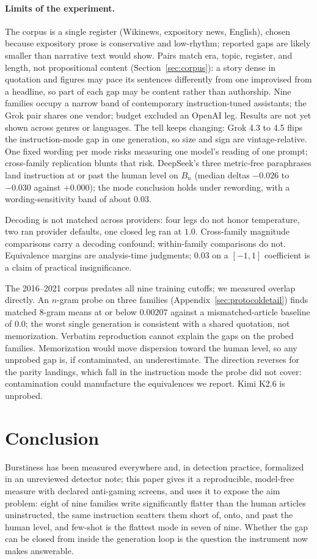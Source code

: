 \documentclass{article}
\begin{document}
\paragraph{Limits of the experiment.}
The corpus is a single register (Wikinews, expository news, English), chosen because expository
prose is conservative and low-rhythm; reported gaps are likely smaller than narrative text
would show. Pairs match era, topic, register, and length, not propositional content
(Section~\ref{sec:corpus}): a story dense in quotation and figures may pace its sentences
differently from one improvised from a headline, so part of each gap may be content
rather than authorship.
Nine families occupy a narrow band of contemporary instruction-tuned assistants; the Grok
pair shares one vendor; budget excluded an OpenAI leg. Results are not yet
shown across genres or languages. The tell keeps changing: Grok 4.3
to 4.5 flips the instruction-mode gap in one generation, so size and sign are
vintage-relative. One fixed wording per mode risks
measuring one model's reading of one prompt; cross-family replication blunts that risk.
DeepSeek's three metric-free paraphrases land instruction at or past the human level on $B_n$
(median deltas $-0.026$ to $-0.030$ against $+0.000$); the mode conclusion holds
under rewording, with a wording-sensitivity band of about $0.03$.

Decoding is not matched across providers: four legs do not honor temperature, two ran
provider defaults, one closed leg ran at $1.0$. Cross-family magnitude comparisons
carry a decoding confound; within-family comparisons do not. Equivalence margins are
analysis-time judgments; $0.03$ on a $[-1,1]$ coefficient is a claim of practical
insignificance.

The 2016--2021 corpus predates all nine training cutoffs; we measured overlap directly. An
$n$-gram probe on three families (Appendix~\ref{sec:protocoldetail}) finds matched 8-gram means
at or below $0.00207$ against a mismatched-article baseline of $0.0$; the worst single
generation is consistent with a shared quotation, not memorization. Verbatim reproduction
cannot explain the gaps on the probed families. Memorization would move dispersion toward the
human level, so any unprobed gap is, if contaminated, an underestimate. The direction reverses
for the parity landings, which fall in the instruction mode the probe did not cover:
contamination could manufacture the equivalences we report. Kimi K2.6 is unprobed.

\section{Conclusion}
Burstiness has been measured everywhere and, in detection practice, formalized in an
unreviewed detector note; this paper gives it a reproducible, model-free measure
with declared anti-gaming screens, and uses it to expose the aim problem: eight of nine
families write significantly flatter than the human articles
uninstructed, the same instruction scatters them short of, onto, and past the human level,
and few-shot is the flattest mode in seven of nine.
Whether the gap can be closed from inside the generation loop is the question the instrument
now makes answerable.
\end{document}
